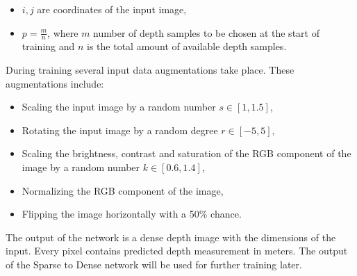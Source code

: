 \documentclass[twoside]{ctuthesis}
\theoremstyle{plain}
\theoremstyle{definition}
\theoremstyle{note}
\begin{document}
\begin{itemize}
	\item $i,j$ are coordinates of the input image,
	\item $p=\frac{m}{n}$, where $m$ number of depth samples to be chosen at the start of training and $n$ is the total amount of available depth samples.
\end{itemize}
During training several input data augmentations take place. These augmentations include:
\begin{itemize}
	\item Scaling the input image by a random number $s\in[1,1.5]$,
	\item Rotating the input image by a random degree $r\in[-5,5]$,
	\item Scaling the brightness, contrast and saturation of the RGB component of the image by a random number $k\in[0.6,1.4]$,
	\item Normalizing the RGB component of the image,
	\item Flipping the image horizontally with a 50\% chance.
\end{itemize}
The output of the network is a dense depth image with the dimensions of the input. Every pixel contains predicted depth measurement in meters. The output of the Sparse to Dense network will be used for further training later.
\end{document}
